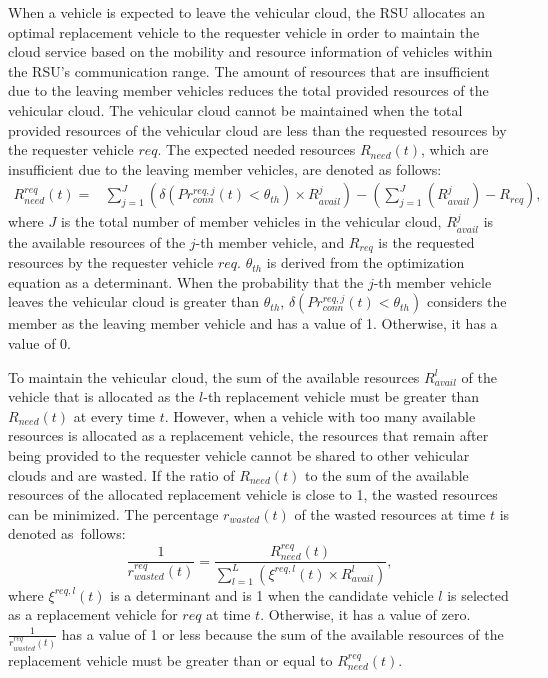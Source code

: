 \documentclass[electronics,aricle,accept,pdftex,moreauthors]{Definitions/mdpi}
\begin{document}
When a vehicle is expected to leave the vehicular cloud, the RSU allocates an optimal replacement vehicle to the requester vehicle in order to maintain the cloud service based on the mobility and resource information of vehicles within the RSU's communication range.
The amount of resources that are insufficient due to the leaving member vehicles reduces the total provided resources of the vehicular cloud.
The vehicular cloud cannot be maintained when the total provided resources of the vehicular cloud are less than the requested resources by the requester vehicle $req$.
The expected needed resources $R_{need}(t)$, which are insufficient due to the leaving member vehicles, are denoted as follows:
\begin{equation} \begin{split}
    R_{need}^{req}(t)=&\sum_{j=1}^{J} \left( \delta(Pr^{req,j}_{conn}(t)<\theta_{th}) \times R_{avail}^{j} \right)- \left(\sum_{j=1}^{J} \left( R_{avail}^{j} \right) - R_{req}\right),
\end{split} \end{equation}
where $J$ is the total number of member vehicles in the vehicular cloud, $R_{avail}^{j}$ is the available resources of the $j$-th member vehicle, and $R_{req}$ is the requested resources by the requester vehicle $req$.
$\theta_{th}$ is derived from the optimization equation as a determinant.
When the probability that the $j$-th member vehicle leaves the vehicular cloud is greater than $\theta_{th}$, $\delta(Pr^{req,j}_{conn}(t)<\theta_{th})$ considers the member as the leaving member vehicle and has a value of 1.
Otherwise, it has a value of 0.

To maintain the vehicular cloud, the sum of the available resources $R_{avail}^{l}$ of the vehicle that is allocated as the $l$-th replacement vehicle must be greater than $R_{need}(t)$ at every time $t$.
However, when a vehicle with too many available resources is allocated as a replacement vehicle, the resources that remain after being provided to the requester vehicle cannot be shared to other vehicular clouds and are wasted.
If the ratio of $R_{need}(t)$ to the sum of the available resources of the allocated replacement vehicle is close to 1, the wasted resources can be minimized.
The percentage $r_{wasted}(t)$ of the wasted resources at time $t$ is denoted as~follows:
\begin{equation}
   \frac{1}{r_{wasted}^{req}(t)} =\frac{R_{need}^{req}(t)}{\sum_{l=1}^{L}\left( \xi^{req,l}(t) \times R_{avail}^{l}\right)},
\end{equation}
where $\xi^{req,l}(t)$ is a determinant and is 1 when the candidate vehicle $l$ is selected as a replacement vehicle for $req$ at time $t$. Otherwise, it has a value of zero.
$\frac{1}{r_{wasted}^{req}(t)}$ has a value of 1 or less because the sum of the available resources of the replacement vehicle must be greater than or equal to $R_{need}^{req}(t)$.
\end{document}
